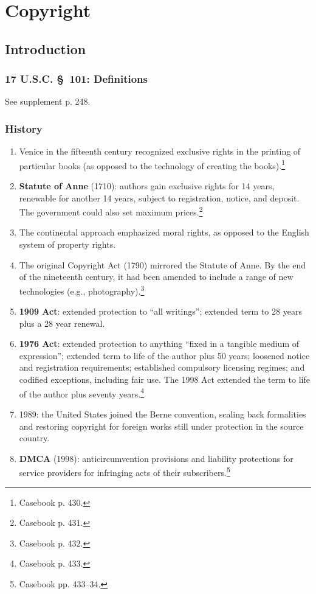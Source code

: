 \section{Copyright}

\subsection{Introduction}

\subsubsection{17 U.S.C. \S\ 101: Definitions}

See supplement p. 248.

\subsubsection{History}

\begin{enumerate}
    \item Venice in the fifteenth century recognized exclusive rights in the 
    printing of particular books (as opposed to the technology of creating the 
    books).\footnote{Casebook p. 430.}
    \item \textbf{Statute of Anne} (1710): authors gain exclusive rights for 
    14 years, renewable for another 14 years, subject to registration, notice, 
    and deposit. The government could also set maximum 
    prices.\footnote{Casebook p. 431.}
    \item The continental approach emphasized moral rights, as opposed to the 
    English system of property rights.
    \item The original Copyright Act (1790) mirrored the Statute of Anne. By 
    the end of the nineteenth century, it had been amended to include a range 
    of new technologies (e.g., photography).\footnote{Casebook p. 432.}
    \item \textbf{1909 Act}: extended protection to ``all writings''; extended 
    term to 28 years plus a 28 year renewal.
    \item \textbf{1976 Act}: extended protection to anything ``fixed in a 
    tangible medium of expression''; extended term to life of the author plus 
    50 years; loosened notice and registration requirements; established 
    compulsory licensing regimes; and codified exceptions, including fair use. 
    The 1998 Act extended the term to life of the author plus seventy 
    years.\footnote{Casebook p. 433.}
    \item 1989: the United States joined the Berne convention, scaling back 
    formalities and restoring copyright for foreign works still under 
    protection in the source country.
    \item \textbf{DMCA} (1998): anticircumvention provisions and liability 
    protections for service providers for infringing acts of their 
    subscribers.\footnote{Casebook pp. 433--34.}
\end{enumerate}

